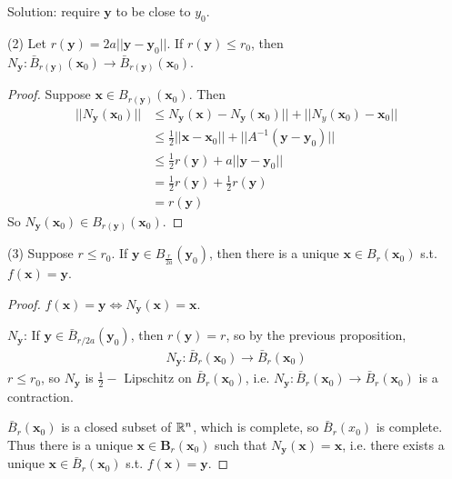 \documentclass[a4paper]{article}
\begin{document}
Solution: require $\mathbf{y}$ to be close to $y_0$.

\begin{prop}(2)
Let $r\left(\mathbf{y}\right) =2a||\mathbf{y}-\mathbf{y}_0||$. If $r\left(\mathbf{y}\right) \leq r_0$, then $N_\mathbf{y}: \bar{B}_{r\left(\mathbf{y}\right)} \left(\mathbf{x}_0\right) \to \bar{B}_{r\left(\mathbf{y}\right)} \left(\mathbf{x}_0\right)$.
\begin{proof}
Suppose $\mathbf{x} \in B_{r\left(\mathbf{y}\right)} \left(\mathbf{x}_0\right)$. Then
\begin{equation*}
\begin{aligned}
||N_\mathbf{y}\left(\mathbf{x}_0\right)|| &\leq N_\mathbf{y}\left(\mathbf{x}\right) - N_\mathbf{y}\left(\mathbf{x}_0\right)|| + ||N_y\left(\mathbf{x}_0\right) - \mathbf{x}_0||\\
&\leq \frac{1}{2}||\mathbf{x}-\mathbf{x}_0|| + ||A^{-1}\left(\mathbf{y}-\mathbf{y}_0\right)||\\
&\leq \frac{1}{2}r\left(\mathbf{y}\right) + a||\mathbf{y}-\mathbf{y}_0||\\
&=\frac{1}{2}r\left(\mathbf{y}\right) + \frac{1}{2}r\left(\mathbf{y}\right)\\
&=r\left(\mathbf{y}\right)
\end{aligned}
\end{equation*}
So $N_\mathbf{y}\left(\mathbf{x}_0\right) \in B_{r\left(\mathbf{y}\right)}\left(\mathbf{x}_0\right)$.
\end{proof}
\end{prop}

\begin{prop}(3)
Suppose $r \leq r_0$. If $\mathbf{y} \in B_{\frac{r}{2a}} \left(\mathbf{y}_0\right)$, then there is a unique $\mathbf{x} \in B_r\left(\mathbf{x}_0\right)$ s.t. $f\left(\mathbf{x}\right) = \mathbf{y}$.
\begin{proof}
$f\left(\mathbf{x}\right) = \mathbf{y} \iff N_\mathbf{y} \left(\mathbf{x}\right) = \mathbf{x}$.

$N_\mathbf{y}$: If $\mathbf{y} \in \bar{B}_{r/2a}\left(\mathbf{y}_0\right)$, then $r\left(\mathbf{y}\right) = r$, so by the previous proposition,
\begin{equation*}
\begin{aligned}
N_\mathbf{y}: \bar{B}_r\left(\mathbf{x}_0\right) \to \bar{B}_r\left(\mathbf{x}_0\right)
\end{aligned}
\end{equation*}
$r \leq r_0$, so $N_\mathbf{y}$ is $\frac{1}{2}-$ Lipschitz on $\bar{B}_r\left(\mathbf{x}_0\right)$, i.e. $N_\mathbf{y}:\bar{B}_r\left(\mathbf{x}_0\right) \to \bar{B}_r\left(\mathbf{x}_0\right)$ is a contraction.

$\bar{B}_r\left(\mathbf{x}_0\right)$ is a closed subset of $\mathbb{R}^n$, which is complete, so $\bar{B}_r\left(x_0\right)$ is complete. Thus there is a unique $\mathbf{x} \in \mathbf{B}_r\left(\mathbf{x}_0\right)$ such that $N_\mathbf{y}\left(\mathbf{x}\right) = \mathbf{x}$, i.e. there exists a unique $\mathbf{x} \in \bar{B}_r\left(\mathbf{x}_0\right)$ s.t. $f\left(\mathbf{x}\right) = \mathbf{y}$.
\end{proof}
\end{prop}
\end{document}

